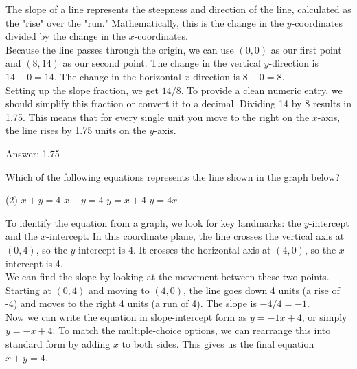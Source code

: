 \documentclass[11pt,paper=a4,answers]{exam}
\begin{document}
\begin{questions}
\begin{solution}
The slope of a line represents the steepness and direction of the line, calculated as the "rise" over the "run." Mathematically, this is the change in the $y$-coordinates divided by the change in the $x$-coordinates.
\\[10pt]
Because the line passes through the origin, we can use $(0, 0)$ as our first point and $(8, 14)$ as our second point. The change in the vertical $y$-direction is $14 - 0 = 14$. The change in the horizontal $x$-direction is $8 - 0 = 8$. 
\\[10pt]
Setting up the slope fraction, we get $14/8$. To provide a clean numeric entry, we should simplify this fraction or convert it to a decimal. Dividing 14 by 8 results in 1.75. This means that for every single unit you move to the right on the $x$-axis, the line rises by 1.75 units on the $y$-axis.

\vspace{15pt}
Answer: \colorbox{yellow!100}{1.75}
\end{solution}

\question
Which of the following equations represents the line shown in the graph below?
\\[10pt]
\begin{tasks}(2)
    \task $x + y = 4$
    \task $x - y = 4$
    \task $y = x + 4$
    \task $y = 4x$
\end{tasks}

\begin{solution}
To identify the equation from a graph, we look for key landmarks: the $y$-intercept and the $x$-intercept. In this coordinate plane, the line crosses the vertical axis at $(0, 4)$, so the $y$-intercept is 4. It crosses the horizontal axis at $(4, 0)$, so the $x$-intercept is 4.
\\[10pt]
We can find the slope by looking at the movement between these two points. Starting at $(0, 4)$ and moving to $(4, 0)$, the line goes down 4 units (a rise of -4) and moves to the right 4 units (a run of 4). The slope is $-4/4 = -1$.
\\[10pt]
Now we can write the equation in slope-intercept form as $y = -1x + 4$, or simply $y = -x + 4$. To match the multiple-choice options, we can rearrange this into standard form by adding $x$ to both sides. This gives us the final equation $x + y = 4$.


\end{solution}
\end{questions}
\end{document}
